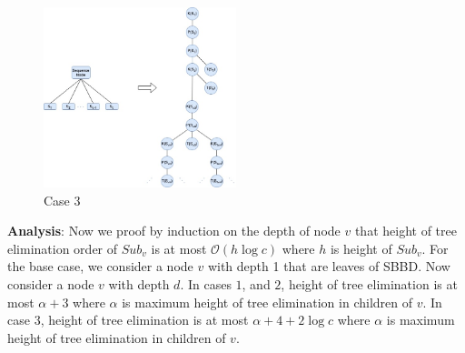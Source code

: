 \documentclass[a4paper,11.5pt,oneside]{article}
\begin{document}
\begin{figure}[!ht]
\centering
\includegraphics[width=0.5\textwidth]{case3.jpg}
\caption{Case 3}
\label{fig:case3}
\end{figure}

\textbf{Analysis}: Now we proof by induction on the depth of node $v$ that height of tree elimination order of $Sub_v$ is at most $\mathcal{O}(h \log c)$ where $h$ is height of $Sub_v$.
For the base case, we consider a node $v$ with depth 1 that are leaves of SBBD. Now consider a node $v$ with depth $d$. In cases $1$, and $2$, height of tree elimination is at most $\alpha + 3$ where $\alpha$ is maximum height of tree elimination in children of $v$. 
In case $3$, height of tree elimination is at most $\alpha + 4 + 2\log c$ where $\alpha$ is maximum height of tree elimination in children of $v$.
\end{document}
